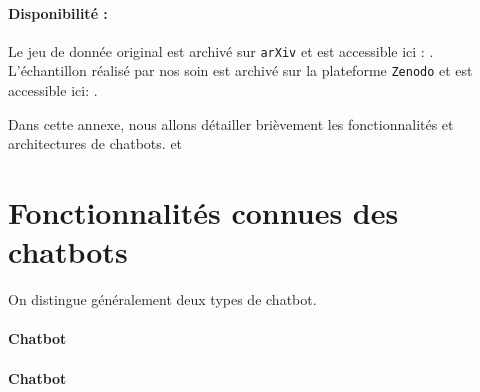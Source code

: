 		\paragraph{Disponibilité :}
		Le jeu de donnée original est archivé sur \texttt{arXiv} et est accessible ici : \cite{scialom-etal:2020:mlsum-multilingual-summarization}.
		L'échantillon réalisé par nos soin est archivé sur la plateforme \texttt{Zenodo} et est accessible ici: \cite{schild-adler:2023:subset-mlsum-multilingual}.


\label{annex:B-ANNEXE-CHATBOT}

	Dans cette annexe, nous allons détailler brièvement les fonctionnalités et architectures de chatbots.
		\cite{costello:2019:gartner-top-technologies} et \cite{goasduff:2019:chatbots-will-appeal}%
	

	\minitoc

	\section{Fonctionnalités connues des chatbots}
	\label{annex:B.1-CHATBOT-FONCTIONNALITES}
	
		On distingue généralement deux types de chatbot.
			\cite{adamopoulou-moussiades:2020:overview-chatbot-technology}
			\cite{brabra-etal:2022:dialogue-management-conversational}
	
		\paragraph{Chatbot }
			\cite{internet:2018:keyword-research-competitor} %
	
		\paragraph{Chatbot }
			\cite{openai:2023:chatgpt} %


